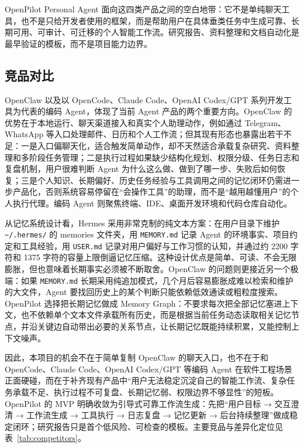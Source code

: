 \documentclass[12pt,a4paper]{ctexart}
\begin{document}
OpenPilot Personal Agent 面向这四类产品之间的空白地带：它不是单纯聊天工具，也不是只给开发者使用的框架，而是帮助用户在具体垂类任务中生成可靠、长期可用、可审计、可迁移的个人智能工作流。研究报告、资料整理和文档自动化是最早验证的模板，而不是项目能力边界。

\subsection{竞品对比}

OpenClaw 以及以 OpenCode、Claude Code、OpenAI Codex/GPT 系列开发工具为代表的编码 Agent，体现了当前 Agent 产品的两个重要方向。OpenClaw 的优势在于本地运行、聊天渠道接入和真实个人助理动作，例如通过 Telegram、WhatsApp 等入口处理邮件、日历和个人工作流；但其现有形态也暴露出若干不足：一是入口偏聊天化，适合触发简单动作，却不天然适合承载复杂研究、资料整理和多阶段任务管理；二是执行过程如果缺少结构化规划、权限分级、任务日志和复盘机制，用户很难判断 Agent 为什么这么做、做到了哪一步、失败后如何恢复；三是个人知识、长期偏好、历史任务经验与工具调用之间的记忆闭环仍需进一步产品化，否则系统容易停留在“会操作工具”的助理，而不是“越用越懂用户”的个人执行代理。编码 Agent 则聚焦终端、IDE、桌面开发环境和代码仓库自动化。

从记忆系统设计看，Hermes 采用非常克制的纯文本方案：在用户目录下维护 \texttt{\~{}/.hermes/} 的 memories 文件夹，用 \texttt{MEMORY.md} 记录 Agent 的环境事实、项目约定和工具经验，用 \texttt{USER.md} 记录对用户偏好与工作习惯的认知，并通过约 2200 字符和 1375 字符的容量上限倒逼记忆压缩。这种设计优点是简单、可读、不会无限膨胀，但也意味着长期事实必须被不断取舍。OpenClaw 的问题则更接近另一个极端：如果 \texttt{MEMORY.md} 长期采用纯追加模式，几个月后容易膨胀成难以检索和维护的大文件，Agent 要找回历史上的某个判断只能依赖低效通读或粗粒度搜索。OpenPilot 选择把长期记忆做成 Memory Graph：不要求每次把全部记忆塞进上下文，也不依赖单个文本文件承载所有历史，而是根据当前任务动态读取相关记忆节点，并沿关键边自动带出必要的关系节点，让长期记忆既能持续积累，又能控制上下文噪声。

因此，本项目的机会不在于简单复制 OpenClaw 的聊天入口，也不在于和 OpenCode、Claude Code、OpenAI Codex/GPT 等编码 Agent 在软件工程场景正面硬碰，而在于补齐现有产品中“用户无法稳定沉淀自己的智能工作流、复杂任务承载不足、执行过程不可复盘、长期记忆弱、权限边界不够显性”的短板。OpenPilot 的 MVP 明确收敛为引导式可靠工作流生成：先把“用户目标 → 交互澄清 → 工作流生成 → 工具执行 → 日志复盘 → 记忆更新 → 后台持续整理”做成稳定闭环；研究报告只是首个低风险、可检查的模板。主要竞品与差异化定位见表~\ref{tab:competitors}。
\end{document}
